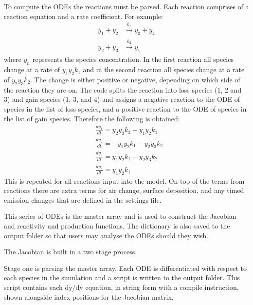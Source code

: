 \documentclass[a4paper]{refart}
\begin{document}
To compute the ODEs the reactions must be parsed. Each reaction comprises of a reaction equation and a rate coefficient. For example:
\begin{equation*}
\begin{split}
    y_1 + y_2 &\xrightarrow[]{k_1} y_3 + y_4\\
    y_2 + y_3 &\xrightarrow[]{k_2} y_1
\end{split}
\end{equation*}
where $y_n$ represents the species concentration. In the first reaction all species change at a rate of $y_1y_2k_1$ and in the second reaction all species change at a rate of $y_2y_3k_2$. The change is either positive or negative, depending on which side of the reaction they are on. The code splits the reaction into loss species (1, 2 and 3) and gain species (1, 3, and 4) and assigns a negative reaction to the ODE of species in the list of loss species, and a positive reaction to the ODE of species in the list of gain species. Therefore the following is obtained:
\begin{equation*}
\begin{split}
    &\frac{dy_1}{dt} = y_2y_3k_2 - y_1y_2k_1\\
    &\frac{dy_2}{dt} = - y_1y_2k_1 - y_2y_3k_2\\
    &\frac{dy_3}{dt} = y_1y_2k_1 - y_2y_3k_2\\
    &\frac{dy_4}{dt} = y_1y_2k_1
\end{split}
\end{equation*}
This is repeated for all reactions input into the model. On top of the terms from reactions there are extra terms for air change, surface deposition, and any timed emission changes that are defined in the settings file.

This series of ODEs is the master array and is used to construct the Jacobian and reactivity and production functions. The dictionary is also saved to the output folder so that users may analyse the ODEs should they wish.

\label{Jacobian}

The Jacobian is built in a two stage process.

Stage one is parsing the master array. Each ODE is differentiated with respect to each species in the simulation and a script is written to the output folder. This script contains each dy/dy equation, in string form with a compile instruction, shown alongside index positions for the Jacobian matrix.
\end{document}

